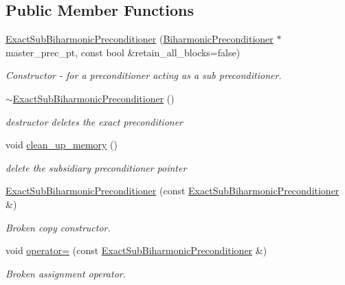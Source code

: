 \subsection*{Public Member Functions}
\begin{DoxyCompactItemize}
\item 
\hyperlink{classoomph_1_1ExactSubBiharmonicPreconditioner_a20ae03e4e565855d9985a91ecf701ac3}{Exact\+Sub\+Biharmonic\+Preconditioner} (\hyperlink{classoomph_1_1BiharmonicPreconditioner}{Biharmonic\+Preconditioner} $\ast$master\+\_\+prec\+\_\+pt, const bool \&retain\+\_\+all\+\_\+blocks=false)
\begin{DoxyCompactList}\small\item\em Constructor -\/ for a preconditioner acting as a sub preconditioner. \end{DoxyCompactList}\item 
\hyperlink{classoomph_1_1ExactSubBiharmonicPreconditioner_abe047bf4a40267be81164fd0132b08cd}{$\sim$\+Exact\+Sub\+Biharmonic\+Preconditioner} ()
\begin{DoxyCompactList}\small\item\em destructor deletes the exact preconditioner \end{DoxyCompactList}\item 
void \hyperlink{classoomph_1_1ExactSubBiharmonicPreconditioner_a846adc01b62a36c06686b50c16f37ac6}{clean\+\_\+up\+\_\+memory} ()
\begin{DoxyCompactList}\small\item\em delete the subsidiary preconditioner pointer \end{DoxyCompactList}\item 
\hyperlink{classoomph_1_1ExactSubBiharmonicPreconditioner_a5db2f5766547c7b931252ffbe0192dad}{Exact\+Sub\+Biharmonic\+Preconditioner} (const \hyperlink{classoomph_1_1ExactSubBiharmonicPreconditioner}{Exact\+Sub\+Biharmonic\+Preconditioner} \&)
\begin{DoxyCompactList}\small\item\em Broken copy constructor. \end{DoxyCompactList}\item 
void \hyperlink{classoomph_1_1ExactSubBiharmonicPreconditioner_a0ef8a2355dbe216c986392e942dc64dd}{operator=} (const \hyperlink{classoomph_1_1ExactSubBiharmonicPreconditioner}{Exact\+Sub\+Biharmonic\+Preconditioner} \&)
\begin{DoxyCompactList}\small\item\em Broken assignment operator. \end{DoxyCompactList}\item 

\end{DoxyCompactItemize}
